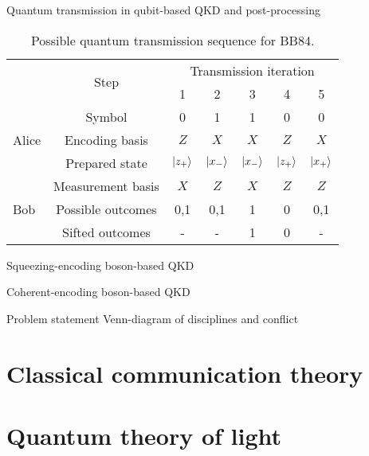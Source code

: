 \documentclass[aspectratio=169]{beamer}
\begin{document}
	\begin{frame}{Quantum transmission in qubit-based QKD and post-processing}
		\begin{table}
			\caption{Possible quantum transmission sequence for BB84.}
			\begin{tabular}{lcccccc}
				\toprule
				& \multirow{2}{*}{Step} & \multicolumn{5}{c}{Transmission iteration} \\
				\cmidrule(lr){3-7}
				& & 1 & 2 & 3 & 4 & 5 \\ 
				\midrule
				\multirow{3}{*}{Alice} & Symbol & \num{0} & \num{1} & \num{1} & \num{0} & \num{0} \\
				& Encoding basis & $Z$ & $X$ & $X$ & $Z$ & $X$ \\
				& Prepared state & $\lvert z_+\rangle$ & $\lvert x_-\rangle$ & $\lvert x_-\rangle$ & $\lvert z_+\rangle$ & $\lvert x_+\rangle$ \\
				\cmidrule{1-1}
				\multirow{3}{*}{Bob} & Measurement basis & $X$ & $Z$ & $X$ & $Z$ & $Z$ \\
				& Possible outcomes & \num{0},\num{1} & \num{0},\num{1} & \num{1} & \num{0} & \num{0},\num{1} \\
				& Sifted outcomes & - & - & \num{1} & \num{0} & - \\
				\bottomrule
			\end{tabular}
		\end{table}
	\end{frame}
	
	\begin{frame}{Squeezing-encoding boson-based QKD}
		
	\end{frame}
	
	\begin{frame}{Coherent-encoding boson-based QKD}
		
	\end{frame}
	
	\begin{frame}{Problem statement}
		Venn-diagram of disciplines
		and 
		conflict
	\end{frame}
	
	\section{Classical communication theory}
	
	\section{Quantum theory of light}
	
\end{document}
